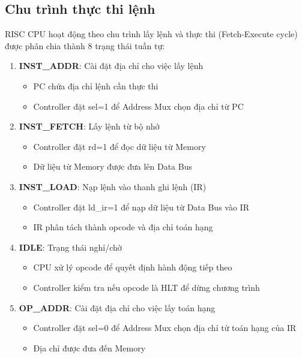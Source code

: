 \subsection{Chu trình thực thi lệnh}

RISC CPU hoạt động theo chu trình lấy lệnh và thực thi (Fetch-Execute cycle) được phân chia thành 8 trạng thái tuần tự:

\begin{enumerate}
    \item \textbf{INST\_ADDR}: Cài đặt địa chỉ cho việc lấy lệnh
    \begin{itemize}
        \item PC chứa địa chỉ lệnh cần thực thi
        \item Controller đặt sel=1 để Address Mux chọn địa chỉ từ PC
    \end{itemize}
    
    \item \textbf{INST\_FETCH}: Lấy lệnh từ bộ nhớ
    \begin{itemize}
        \item Controller đặt rd=1 để đọc dữ liệu từ Memory
        \item Dữ liệu từ Memory được đưa lên Data Bus
    \end{itemize}

    \item \textbf{INST\_LOAD}: Nạp lệnh vào thanh ghi lệnh (IR)
    \begin{itemize}
        \item Controller đặt ld\_ir=1 để nạp dữ liệu từ Data Bus vào IR
        \item IR phân tách thành opcode và địa chỉ toán hạng
    \end{itemize}

    \item \textbf{IDLE}: Trạng thái nghỉ/chờ
    \begin{itemize}
        \item CPU xử lý opcode để quyết định hành động tiếp theo
        \item Controller kiểm tra nếu opcode là HLT để dừng chương trình
    \end{itemize}

    \item \textbf{OP\_ADDR}: Cài đặt địa chỉ cho việc lấy toán hạng
    \begin{itemize}
        \item Controller đặt sel=0 để Address Mux chọn địa chỉ từ toán hạng của IR
        \item Địa chỉ được đưa đến Memory
    \end{itemize}


\end{enumerate}
